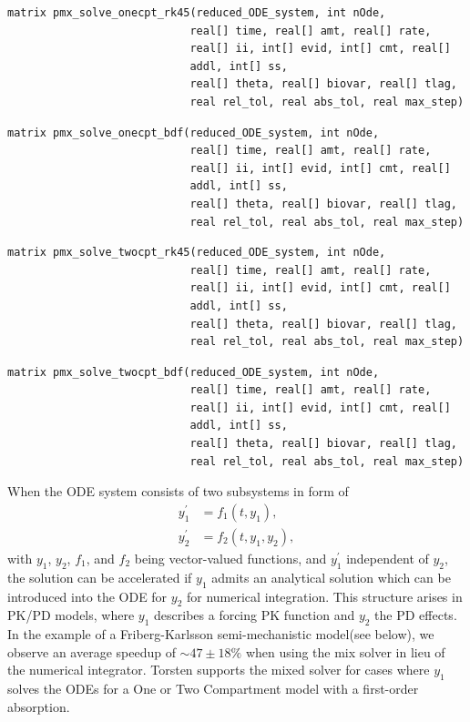 \documentclass[11pt, reqno, oneside]{amsbook}
\numberwithin{equation}{chapter}
\numberwithin{figure}{chapter}
\numberwithin{table}{chapter}
\theoremstyle{remark}
\begin{document}
\begin{verbatim}
matrix pmx_solve_onecpt_rk45(reduced_ODE_system, int nOde,
                            real[] time, real[] amt, real[] rate,
                            real[] ii, int[] evid, int[] cmt, real[]
                            addl, int[] ss,
                            real[] theta, real[] biovar, real[] tlag,
                            real rel_tol, real abs_tol, real max_step)
\end{verbatim}
\begin{verbatim}
matrix pmx_solve_onecpt_bdf(reduced_ODE_system, int nOde,
                            real[] time, real[] amt, real[] rate,
                            real[] ii, int[] evid, int[] cmt, real[]
                            addl, int[] ss,
                            real[] theta, real[] biovar, real[] tlag,
                            real rel_tol, real abs_tol, real max_step)
\end{verbatim}
\begin{verbatim}
matrix pmx_solve_twocpt_rk45(reduced_ODE_system, int nOde,
                            real[] time, real[] amt, real[] rate,
                            real[] ii, int[] evid, int[] cmt, real[]
                            addl, int[] ss,
                            real[] theta, real[] biovar, real[] tlag,
                            real rel_tol, real abs_tol, real max_step)
\end{verbatim}
\begin{verbatim}
matrix pmx_solve_twocpt_bdf(reduced_ODE_system, int nOde,
                            real[] time, real[] amt, real[] rate,
                            real[] ii, int[] evid, int[] cmt, real[]
                            addl, int[] ss,
                            real[] theta, real[] biovar, real[] tlag,
                            real rel_tol, real abs_tol, real max_step)
\end{verbatim}
When the ODE system consists of two subsystems in form of
\begin{align*}
  y_1^\prime &= f_1(t, y_1), \\
  y_2^\prime &= f_2(t, y_1, y_2),
\end{align*}
with \(y_1\), \(y_2\), \(f_1\), and \(f_2\) being vector-valued functions, and
\(y_1^\prime\) independent of \(y_2\), the solution can be
accelerated if \(y_1\) admits an analytical solution which can
be introduced into the ODE for \(y_2\) for numerical
integration. This structure arises in PK/PD
models, where \(y_1\) describes a forcing PK function and \(y_2\) the PD
effects. In the example of a Friberg-Karlsson
semi-mechanistic model(see below), we observe an average speedup of
\(\sim 47 \pm 18 \%\) when using the mix solver in lieu of the numerical
integrator. Torsten supports the mixed solver for
cases where \(y_1\) solves the ODEs for a One or Two Compartment model
with a first-order absorption.
\end{document}
